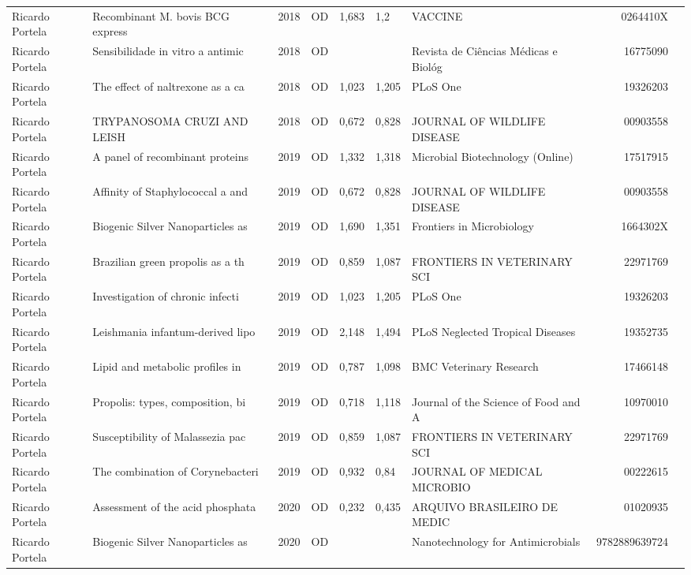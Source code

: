 \documentclass[12pt,brazil]{article}\usepackage[]{graphicx}\usepackage[]{xcolor}
\begin{document}
\begin{longtable}{lllrrllrr}
Ricardo Portela & Recombinant M. bovis BCG express & 2018 & OD & 1,683 & 1,2 & VACCINE & 0264410X \\
Ricardo Portela & Sensibilidade in vitro a antimic & 2018 & OD &  &  & Revista de Ciências Médicas e Biológ & 16775090 \\
Ricardo Portela & The effect of naltrexone as a ca & 2018 & OD & 1,023 & 1,205 & PLoS One & 19326203 \\
Ricardo Portela & TRYPANOSOMA CRUZI AND LEISH & 2018 & OD & 0,672 & 0,828 & JOURNAL OF WILDLIFE DISEASE & 00903558 \\
Ricardo Portela & A panel of recombinant proteins  & 2019 & OD & 1,332 & 1,318 & Microbial Biotechnology (Online) & 17517915 \\
Ricardo Portela & Affinity of Staphylococcal a and & 2019 & OD & 0,672 & 0,828 & JOURNAL OF WILDLIFE DISEASE & 00903558 \\
Ricardo Portela & Biogenic Silver Nanoparticles as & 2019 & OD & 1,690 & 1,351 & Frontiers in Microbiology & 1664302X \\
Ricardo Portela & Brazilian green propolis as a th & 2019 & OD & 0,859 & 1,087 & FRONTIERS IN VETERINARY SCI & 22971769 \\
Ricardo Portela & Investigation of chronic infecti & 2019 & OD & 1,023 & 1,205 & PLoS One & 19326203 \\
Ricardo Portela & Leishmania infantum-derived lipo & 2019 & OD & 2,148 & 1,494 & PLoS Neglected Tropical Diseases & 19352735 \\
Ricardo Portela & Lipid and metabolic profiles in  & 2019 & OD & 0,787 & 1,098 & BMC Veterinary Research & 17466148 \\
Ricardo Portela & Propolis: types, composition, bi & 2019 & OD & 0,718 & 1,118 & Journal of the Science of Food and A & 10970010 \\
Ricardo Portela & Susceptibility of Malassezia pac & 2019 & OD & 0,859 & 1,087 & FRONTIERS IN VETERINARY SCI & 22971769 \\
Ricardo Portela & The combination of Corynebacteri & 2019 & OD & 0,932 & 0,84 & JOURNAL OF MEDICAL MICROBIO & 00222615 \\
Ricardo Portela & Assessment of the acid phosphata & 2020 & OD & 0,232 & 0,435 & ARQUIVO BRASILEIRO DE MEDIC & 01020935 \\
\rowcolor{duplic}\rowcolor{duplic}\rowcolor{duplic}\rowcolor{duplic}\rowcolor{duplic}\rowcolor{duplic}\rowcolor{duplic}\rowcolor{duplic}\rowcolor{duplic}\rowcolor{duplic}\rowcolor{duplic}\rowcolor{duplic}\rowcolor{duplic}\rowcolor{duplic}\rowcolor{duplic}\rowcolor{duplic}Ricardo Portela & Biogenic Silver Nanoparticles as & 2020 & OD &  &  & Nanotechnology for Antimicrobials & 9782889639724 \\

\end{longtable}
\end{document}
